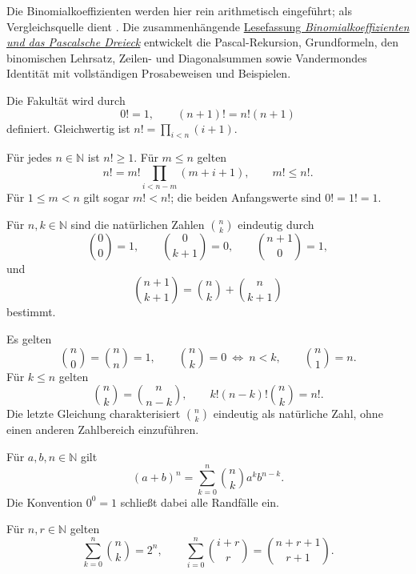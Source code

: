 Die Binomialkoeffizienten werden hier rein arithmetisch eingeführt;
als Vergleichsquelle dient \cite{natchoose}.
Die zusammenhängende
\href{../binomial/_B10-binomial-reading.pdf\#binomial.reading}{Lesefassung
\emph{Binomialkoeffizienten und das Pascalsche Dreieck}} entwickelt die
Pascal-Rekursion, Grundformeln, den binomischen Lehrsatz, Zeilen- und
Diagonalsummen sowie Vandermondes Identität mit vollständigen
Prosabeweisen und Beispielen.

\begin{definition}[Fakultät]
\label{b10guide:def:factorial}
Die Fakultät wird durch
\[
 0!=1,\qquad (n+1)!=n!(n+1)
\]
definiert. Gleichwertig ist $n!=\prod_{i<n}(i+1)$.
\end{definition}

\begin{theorem}[Fakultätsregeln]
\label{b10guide:thm:factorial-laws}
Für jedes $n\in\mathbb N$ ist $n!\ge1$.
Für $m\le n$ gelten
\[
 n!=m!\prod_{i<n-m}(m+i+1),\qquad m!\le n!.
\]
Für $1\le m<n$ gilt sogar $m!<n!$; die beiden Anfangswerte
sind $0!=1!=1$.
\end{theorem}

\begin{definition}
\label{b10guide:def:binomial}
Für $n,k\in\mathbb N$ sind die natürlichen Zahlen $\binom nk$
eindeutig durch
\[
 \binom00=1,\qquad \binom0{k+1}=0,\qquad
 \binom{n+1}0=1,
\]
und
\[
 \binom{n+1}{k+1}=\binom nk+\binom n{k+1}
\]
bestimmt.
\end{definition}

\begin{theorem}
\label{b10guide:thm:binomial-laws}
Es gelten
\[
 \binom n0=\binom nn=1,\qquad
 \binom nk=0\ \Longleftrightarrow\ n<k,
 \qquad \binom n1=n.
\]
Für $k\le n$ gelten
\[
 \binom nk=\binom n{n-k},\qquad
 k!(n-k)!\binom nk=n!.
\]
Die letzte Gleichung charakterisiert $\binom nk$ eindeutig als
natürliche Zahl, ohne einen anderen Zahlbereich einzuführen.
\end{theorem}

\begin{theorem}
\label{b10guide:thm:binomial-theorem}
Für $a,b,n\in\mathbb N$ gilt
\[
 (a+b)^n=\sum_{k=0}^{n}\binom nk a^k b^{n-k}.
\]
Die Konvention $0^0=1$ schließt dabei alle Randfälle ein.
\end{theorem}

\begin{theorem}
\label{b10guide:thm:binomial-sums}
Für $n,r\in\mathbb N$ gelten
\[
 \sum_{k=0}^{n}\binom nk=2^n,\qquad
 \sum_{i=0}^{n}\binom{i+r}r=\binom{n+r+1}{r+1}.
\]
\end{theorem}


